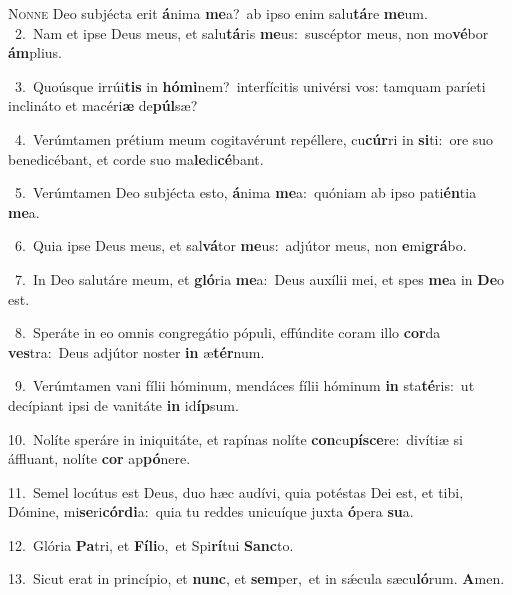 \lettrine{\initial\textcolor{\initialcolor}{N}}{onne} Deo subjécta erit \textbf{á}\-nima \textbf{me}\-a?~\star ab ipso enim salu\-\textbf{tá}\-re \textbf{me}\-um.\\
{\numbfont\textcolor{\numbcolor}{~2.}}~Nam et ipse Deus meus, et salu\-\textbf{tá}\-ris \textbf{me}\-us:~\star suscéptor meus, non mo\-\textbf{vé}\-bor \textbf{ám}\-plius.\par
{\numbfont\textcolor{\numbcolor}{~3.}}~Quoúsque irrúi\textbf{tis} in \textbf{hó}\-\textbf{mi}nem?~\star interfícitis univérsi vos: tamquam paríeti inclináto et macéri\textbf{æ} de\-\textbf{púl}\-sæ?\par
{\numbfont\textcolor{\numbcolor}{~4.}}~Verúmtamen prétium meum cogitavérunt repéllere, cu\-\textbf{cúr}\-ri in \textbf{si}\-ti:~\star ore suo benedicébant, et corde suo ma\-\textbf{le}\-di\-\textbf{cé}\-bant.\par
{\numbfont\textcolor{\numbcolor}{~5.}}~Verúmtamen Deo subjécta esto, \textbf{á}\-nima \textbf{me}\-a:~\star quóniam ab ipso pati\-\textbf{én}\-tia \textbf{me}\-a.\par
{\numbfont\textcolor{\numbcolor}{~6.}}~Quia ipse Deus meus, et sal\-\textbf{vá}\-tor \textbf{me}\-us:~\star adjútor meus, non \textbf{e}\-mi\-\textbf{grá}\-bo.\par
{\numbfont\textcolor{\numbcolor}{~7.}}~In Deo salutáre meum, et \textbf{gló}\-ria \textbf{me}\-a:~\star Deus auxílii mei, et spes \textbf{me}\-a in \textbf{De}\-o est.\par
{\numbfont\textcolor{\numbcolor}{~8.}}~Speráte in eo omnis congregátio pópuli, effúndite coram illo \textbf{cor}\-da \textbf{ves}\-tra:~\star Deus adjútor noster \textbf{in} æ\-\textbf{tér}\-num.\par
{\numbfont\textcolor{\numbcolor}{~9.}}~Verúmtamen vani fílii hóminum, mendáces fílii hóminum \textbf{in} sta\-\textbf{té}\-ris:~\star ut decípiant ipsi de vanitáte \textbf{in} id\-\textbf{íp}\-sum.\par
{\numbfont\textcolor{\numbcolor}{10.}}~Nolíte speráre in iniquitáte, et rapínas nolíte \textbf{con}\-cu\-\textbf{pí}\-\textbf{sce}re:~\star divítiæ si áffluant, nolíte \textbf{cor} ap\-\textbf{pó}\-nere.\par
{\numbfont\textcolor{\numbcolor}{11.}}~Semel locútus est Deus, duo hæc audívi, quia potéstas Dei est, et tibi, Dómine, mi\-\textbf{se}\-ri\-\textbf{cór}\-\textbf{di}a:~\star quia tu reddes unicuíque juxta \textbf{ó}\-pera \textbf{su}\-a.\par
{\numbfont\textcolor{\numbcolor}{12.}}~Glória \textbf{Pa}\-tri, et \textbf{Fí}\-\textbf{li}o,~\star et Spi\-\textbf{rí}\-tui \textbf{Sanc}\-to.\par
{\numbfont\textcolor{\numbcolor}{13.}}~Sicut erat in princípio, et \textbf{nunc}\-, et \textbf{sem}\-per,~\star et in sǽcula sæcu\-\textbf{ló}\-rum. \textbf{A}\-men.\par
